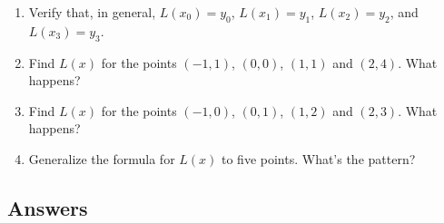 \documentclass{ximera}
\begin{document}
\begin{enumerate}
\begin{enumerate}
\item  Verify that, in general, $L(x_{0}) = y_{0}$,  $L(x_{1}) = y_{1}$, $L(x_{2}) = y_{2}$, and  $L(x_{3}) = y_{3}$.

\item  Find $L(x)$ for the points $(-1,1)$, $(0,0)$,  $(1,1)$ and $(2,4)$.  What happens?

\item  Find $L(x)$ for the points $(-1,0)$, $(0,1)$,  $(1,2)$ and $(2,3)$.  What happens?

\item  Generalize the formula for $L(x)$ to five points.  What's the pattern?

\end{enumerate}

\setcounter{HW}{\value{enumi}}
\end{enumerate}
\newpage

\subsection{Answers}
\end{document}
